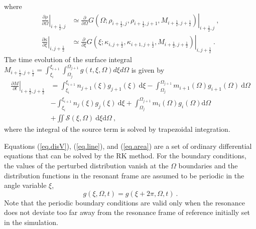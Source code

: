 \documentclass[times,12pt,3p,longtitle]{elsarticle}
\begin{document}
where 
\begin{equation}
    \begin{aligned}
    \left.\frac{\partial \rho}{\partial \Omega}\right|_{i+\frac{1}{2},j}
    &\simeq \left.\frac{\partial}{\partial \Omega} G(\Omega;\rho_{i+\frac{1}{2},j},\rho_{i+\frac{1}{2},j+1}, M_{i+\frac{1}{2},j+\frac{1}{2}})\right|_{i+\frac{1}{2},j}~, \\
    \left.\frac{\partial \kappa}{\partial \xi}\right|_{i,j+\frac{1}{2}}
 &\simeq \left.\frac{\partial}{\partial \xi} G(\xi;\kappa_{i,j+\frac{1}{2}},\kappa_{i+1,j+\frac{1}{2}}, M_{i+\frac{1}{2},j+\frac{1}{2}})\right|_{i,j+\frac{1}{2}}~.
    \end{aligned}
\end{equation} 
The time evolution of the surface integral $M_{i+\frac{1}{2},j+\frac{1}{2}}=\int_{\xi_i}^{\xi_{i+1}}\int_{\Omega_j}^{\Omega_{j+1}}g(t,\xi,\Omega)d\xi d\Omega$
is given by \cite{imadera2009}
\begin{equation}\label{eq.area}
    \begin{aligned}
         \left.\frac{\partial M}{\partial t}\right|_{i+\frac{1}{2},j+\frac{1}{2}}
         &= \int_{\xi_i}^{\xi_{i+1}} n_{j+1}(\xi) g_{j+1}(\xi)~\mathrm{d}\xi - \int_{\Omega_j}^{\Omega_{j+1}} m_{i+1}(\Omega) g_{i+1} (\Omega)~\mathrm{d} \Omega \\
        & - \int_{\xi_i}^{\xi_{i+1}} n_{j}(\xi) g_{j}(\xi)~\mathrm{d}\xi + \int_{\Omega_j}^{\Omega_{j+1}} m_{i}(\Omega) g_{i} (\Omega) \mathrm{d}\Omega \\
        &+ \iint \mathcal{S}(\xi,\Omega)~\mathrm{d}\xi\mathrm{d}\Omega~,
    \end{aligned}
\end{equation}
where the integral of the source term is solved by trapezoidal integration.


Equations (\ref{eq.disV}), (\ref{eq.line}), and (\ref{eq.area})
are a set of ordinary differential equations that can be solved  by the RK method.
For the boundary conditions, the values of the perturbed distribution vanish at the $\Omega$ boundaries
and
the distribution functions in  the resonant frame are assumed to be periodic in the  angle variable $\xi$,
\begin{equation}
    g\left(\xi,\Omega,t\right)=g\left(\xi+2 \pi,\Omega,t\right)~.
\end{equation}
Note that the periodic boundary conditions are valid only when the resonance does not deviate too far away from the  resonance frame of reference initially set in the simulation.
\end{document}
